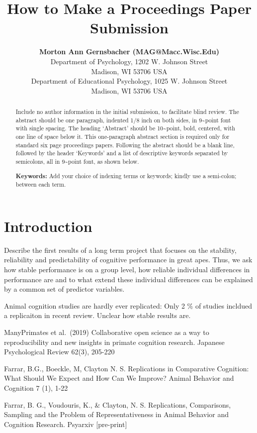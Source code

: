 \documentclass[10pt, letterpaper]{article}
\title{How to Make a Proceedings Paper Submission}
\author{{\large \bf Morton Ann Gernsbacher (MAG@Macc.Wisc.Edu)} \\ Department of Psychology, 1202 W. Johnson Street \\ Madison, WI 53706 USA \AND {\large \bf Sharon J.~Derry (SDJ@Macc.Wisc.Edu)} \\ Department of Educational Psychology, 1025 W. Johnson Street \\ Madison, WI 53706 USA}
\begin{document}
\maketitle

\begin{abstract}
Include no author information in the initial submission, to facilitate
blind review. The abstract should be one paragraph, indented 1/8 inch on
both sides, in 9\textasciitilde point font with single spacing. The
heading `Abstract' should be 10\textasciitilde point, bold, centered,
with one line of space below it. This one-paragraph abstract section is
required only for standard six page proceedings papers. Following the
abstract should be a blank line, followed by the header `Keywords' and a
list of descriptive keywords separated by semicolons, all in
9\textasciitilde point font, as shown below.

\textbf{Keywords:}
Add your choice of indexing terms or keywords; kindly use a semi-colon;
between each term.
\end{abstract}

\hypertarget{introduction}{%
\section{Introduction}\label{introduction}}

Describe the first results of a long term project that focuses on the
stability, reliability and predictability of cognitive performance in
great apes. Thus, we ask how stable performance is on a group level, how
reliable individual differences in performance are and to what extend
these individual differences can be explained by a common set of
predictor variables.

Animal cognition studies are hardly ever replicated: Only 2 \% of
studies incldued a replicaiton in recent review. Unclear how stable
results are.

ManyPrimates et al.~(2019) Collaborative open science as a way to
reproducibility and new insights in primate cognition research. Japanese
Psychological Review 62(3), 205-220

Farrar, B.G., Boeckle, M, Clayton N. S. Replications in Comparative
Cognition: What Should We Expect and How Can We Improve? Animal Behavior
and Cognition 7 (1), 1-22

Farrar, B. G., Voudouris, K., \& Clayton, N. S. Replications,
Comparisons, Sampling and the Problem of Representativeness in Animal
Behavior and Cognition Research. Psyarxiv {[}pre-print{]}
\end{document}
